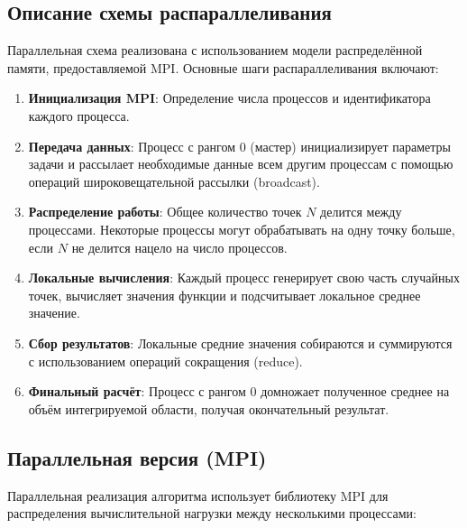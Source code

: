 \documentclass[a4paper,12pt]{article}
\begin{document}
\subsection{Описание схемы распараллеливания}

Параллельная схема реализована с использованием модели распределённой памяти, предоставляемой MPI. Основные шаги распараллеливания включают:

\begin{enumerate}
    \item \textbf{Инициализация MPI}: Определение числа процессов и идентификатора каждого процесса.
    
    \item \textbf{Передача данных}: Процесс с рангом 0 (мастер) инициализирует параметры задачи и рассылает необходимые данные всем другим процессам с помощью операций широковещательной рассылки (broadcast).
    
    \item \textbf{Распределение работы}: Общее количество точек $N$ делится между процессами. Некоторые процессы могут обрабатывать на одну точку больше, если $N$ не делится нацело на число процессов.
    
    \item \textbf{Локальные вычисления}: Каждый процесс генерирует свою часть случайных точек, вычисляет значения функции и подсчитывает локальное среднее значение.
    
    \item \textbf{Сбор результатов}: Локальные средние значения собираются и суммируются с использованием операций сокращения (reduce).
    
    \item \textbf{Финальный расчёт}: Процесс с рангом 0 домножает полученное среднее на объём интегрируемой области, получая окончательный результат.
\end{enumerate}

\subsection{Параллельная версия (MPI)}

Параллельная реализация алгоритма использует библиотеку MPI для распределения вычислительной нагрузки между несколькими процессами:
\end{document}
